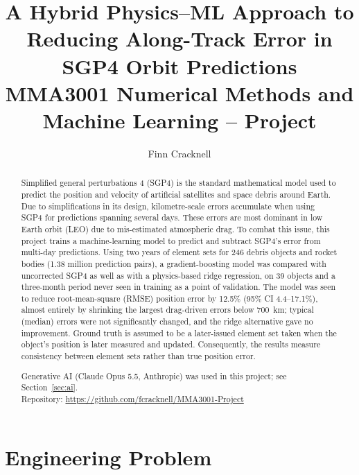 \documentclass[11pt, a4paper]{article}
\title{\textbf{A Hybrid Physics–ML Approach to Reducing Along-Track Error in SGP4 Orbit Predictions}\\[6mm]
\large MMA3001 Numerical Methods and Machine Learning -- Project}
\author{Finn Cracknell}
\date{\mydate}
\begin{document}
\maketitle

\tableofcontents

\vspace{10mm}

\begin{abstract}
Simplified general perturbations 4 (SGP4) is the standard mathematical model used to predict the position and velocity of artificial satellites and space debris around Earth. Due to simplifications in its design, kilometre-scale errors accumulate when using SGP4 for predictions spanning several days. These errors are most dominant in low Earth orbit (LEO) due to mis-estimated atmospheric drag. To combat this issue, this project trains a machine-learning model to predict and subtract SGP4's error from multi-day predictions. Using two years of element sets for 246 debris objects and rocket bodies (1.38 million prediction pairs), a gradient-boosting model was compared with uncorrected SGP4 as well as with a physics-based ridge regression, on 39 objects and a three-month period never seen in training as a point of validation. The model was seen to reduce root-mean-square (RMSE) position error by 12.5\% (95\% CI 4.4--17.1\%), almost entirely by shrinking the largest drag-driven errors below 700~km; typical (median) errors were not significantly changed, and the ridge alternative gave no improvement. Ground truth is assumed to be a later-issued element set taken when the object's position is later measured and updated. Consequently, the results measure consistency between element sets rather than true position error.

\vspace{3mm}
\begin{center}
Generative AI (Claude Opus 5.5, Anthropic) was used in this project; see Section~\ref{sec:ai}.\\
Repository: \url{https://github.com/fcracknell/MMA3001-Project}
\end{center}
\end{abstract}

\FloatBarrier

\section{Engineering Problem}\label{sec:1}
\end{document}
